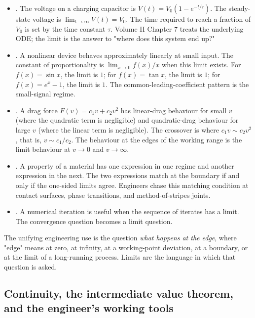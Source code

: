 \begin{itemize}[leftmargin=*]
  \item {}. The voltage on a charging capacitor is
    $V(t) = V_{0}(1 - e^{-t/\tau})$. The steady-state voltage is
    $\lim_{t \to \infty} V(t) = V_{0}$. The time required to reach a
    fraction of $V_{0}$ is set by the time constant $\tau$. Volume II
    Chapter 7 treats the underlying ODE; the limit is the answer to
    "where does this system end up?"
  \item {}. A nonlinear device behaves
    approximately linearly at small input. The constant of
    proportionality is $\lim_{x \to 0} f(x)/x$ when this limit exists.
    For $f(x) = \sin x$, the limit is $1$; for $f(x) = \tan x$, the
    limit is $1$; for $f(x) = e^{x} - 1$, the limit is $1$. The
    common-leading-coefficient pattern is the small-signal regime.
  \item {}. A drag force $F(v) = c_{1} v +
    c_{2} v^{2}$ has linear-drag behaviour for small $v$ (where the
    quadratic term is negligible) and quadratic-drag behaviour for
    large $v$ (where the linear term is negligible). The crossover is
    where $c_{1} v \sim c_{2} v^{2}$, that is, $v \sim c_{1}/c_{2}$.
    The behaviour at the edges of the working range is the limit
    behaviour at $v \to 0$ and $v \to \infty$.
  \item {}. A property of a material
    has one expression in one regime and another expression in the
    next. The two expressions match at the boundary if and only if the
    one-sided limits agree. Engineers chase this matching condition at
    contact surfaces, phase transitions, and method-of-stripes joints.
  \item {}. A numerical iteration
    is useful when the sequence of iterates has a limit. The
    convergence question becomes a limit question.
\end{itemize}

The unifying engineering use is the question \emph{what happens at the
edge}, where "edge" means at zero, at infinity, at a working-point
deviation, at a boundary, or at the limit of a long-running process.
Limits are the language in which that question is asked.

\subsection{Continuity, the intermediate value theorem, and the engineer's
working tools}

